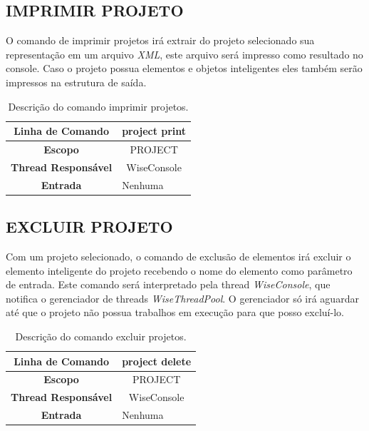 \documentclass[a4paper,12pt]{monografia}
\theoremstyle{plain}
\theoremstyle{definition}
\theoremstyle{remark}
\begin{document}
\subsection{IMPRIMIR PROJETO}\label{sec:print_projects}

O comando de imprimir projetos irá extrair do projeto selecionado sua representação em um arquivo \textit{XML}, este arquivo será impresso como resultado no console. Caso o projeto possua elementos e objetos inteligentes eles também serão impressos na estrutura de saída.

\begin{center}
\begin{table}[!htbp]
	\begin{tabular}{|c|m{}|}
		\hline
		\textbf{Linha de Comando} & \multicolumn{1}{c|}{project print} \\
		\hline
		\textbf{Escopo} & \multicolumn{1}{c|}{PROJECT} \\
		\hline
		\textbf{Thread Responsável} & \multicolumn{1}{c|}{WiseConsole} \\
		\hline
		\textbf{Entrada} & Nenhuma \\
		\hline
	\end{tabular}
	\caption{Descrição do comando imprimir projetos.}
	\label{tab:print_projects}
\end{table}
\end{center}

\subsection{EXCLUIR PROJETO}\label{sec:delete_projects}

Com um projeto selecionado, o comando de exclusão de elementos irá excluir o elemento inteligente do projeto recebendo o nome do elemento como parâmetro de entrada. Este comando será interpretado pela thread \textit{WiseConsole}, que notifica o gerenciador de threads \textit{WiseThreadPool}. O gerenciador só irá aguardar até que o projeto não possua trabalhos em execução para que posso excluí-lo.

\begin{center}
\begin{table}[!htbp]
	\begin{tabular}{|c|m{}|}
		\hline
		\textbf{Linha de Comando} & \multicolumn{1}{c|}{project delete} \\
		\hline
		\textbf{Escopo} & \multicolumn{1}{c|}{PROJECT} \\
		\hline
		\textbf{Thread Responsável} & \multicolumn{1}{c|}{WiseConsole} \\
		\hline
		\textbf{Entrada} & Nenhuma \\
		\hline
	\end{tabular}
	\caption{Descrição do comando excluir projetos.}
	\label{tab:delete_projects}
\end{table}
\end{center}
\end{document}
